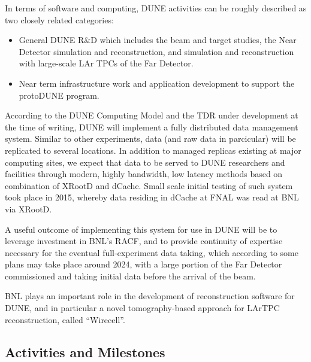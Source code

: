 \documentclass[pdftex,12pt,letter]{article}
\begin{document}
In terms of software and computing, DUNE activities can be roughly described as two closely related
categories:
\begin{itemize}

\item General DUNE R\&D which includes the beam and target studies, the Near Detector simulation and reconstruction,
and simulation and reconstruction with large-scale LAr TPCs of the Far Detector.

\item Near term infrastructure work and application development to support the protoDUNE program.

\end{itemize}


According to the DUNE Computing Model and the TDR under development at the time of writing,
DUNE will implement a fully distributed data management system. Similar to other experiments,
data (and raw data in parcicular) will be replicated to several locations. In addition to managed
replicas existing at major computing sites, we expect that data to be  served to DUNE
researchers and facilities through modern, highly bandwidth, low
latency methods based on combination of XRootD and dCache. Small scale initial testing
of such system took place in 2015, whereby data residing in dCache at FNAL was read
at BNL via XRootD.

A useful outcome of implementing this system for use in DUNE will be to leverage
investment in BNL's RACF, and to
provide continuity of expertise necessary for the eventual
full-experiment data taking, which according to some plans may take
place around 2024, with a large portion of the Far Detector
commissioned and taking initial data before the arrival of the beam.

BNL plays an important role in the development of reconstruction software for DUNE, and
in particular a novel tomography-based approach for LArTPC reconstruction, called ``Wirecell''.

\subsection{Activities and Milestones}
\end{document}
